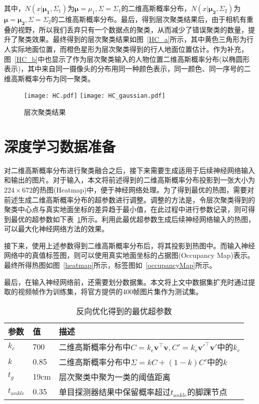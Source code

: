 其中，$N(x|\bm{\mu_1},\Sigma_1)$为$\bm{\mu}=\mu_1, \Sigma=\Sigma_1$的二维高斯概率分布，$N(x|\bm{\bm{\mu_2}},\Sigma_2)$为$\bm{\mu}=\bm{\mu_2}, \Sigma=\Sigma_2$的二维高斯概率分布。最后，得到层次聚类结果后，由于相机有重叠的视野，所以我们丢弃只有一个数据点的聚类，从而减少了错误聚类的数量，提升了聚类效果。最终得到的层次聚类结果如图~\ref{HC_a}所示，其中黄色三角形为行人实际地面位置，而橙色星形为层次聚类得到的行人地面位置估计。作为补充，图~\ref{HC_b}中也显示了作为层次聚类输入的人物位置二维高斯概率分布(以椭圆形表示)，其中来自同一摄像头的分布用同一种颜色表示，同一颜色、同一序号的二维高斯概率分布为同一聚类。
\begin{figure}
    \centering
    \subcaptionbox{\label{HC_a}}
      {\texttt{[image: HC.pdf]}}
    \subcaptionbox{\label{HC_b}}
      {\texttt{[image: HC\_gaussian.pdf]}}
    \caption{层次聚类结果}
    \label{HC}
\end{figure}

\section{深度学习数据准备}

对二维高斯概率分布进行聚类融合之后，接下来需要生成适用于后续神经网络输入和输出的图片。对于输入，本文将前述得到的二维高斯概率分布投影到一张大小为$224\times672$的热图(Heatmap)中，便于神经网络处理。为了得到最优的热图，需要对前述生成二维高斯概率分布的超参数进行调整。调整的方法是，令层次聚类得到的聚类中心点与真实地面坐标的差异趋于最小值，在此过程中进行参数记录，则可得到最优的超参数如下表~\ref{parameter_table}所示。利用此最优超参数生成后续神经网络输入的热图，可以最大化神经网络方法的效果。

接下来，使用上述参数得到二维高斯概率分布后，将其投影到热图中。而输入神经网络中的真值标签图，则可以使用真实地面坐标的占据图(Occupancy Map)\cite{fleuret2007multicamera}表示。最终所得热图如图~\ref{heatmap}所示，标签图如~\ref{occupancyMap}所示。

最后，在输入神经网络前，还需要划分数据集。本文将上文中数据集扩充时通过提取的视频帧作为训练集，将官方提供的400帧图片集作为测试集。
\begin{table}
    \centering
    \caption{反向优化得到的最优超参数}
    \begin{tabular}{lll}
        \toprule
        参数 & 值  & 描述         \\
        \midrule
        $k_{c}$ & 700 & 二维高斯概率分布中$C=k_{c}\bm{v}^\top\bm{v}, C'=k_{c}\bm{v}'^\top\bm{v}'$中的$k_{c}$ \\
        $k$   & 0.85 &  二维高斯概率分布中$\Sigma=kC + (1-k)C'$中的$k$   \\
        $t_{g}$ & 19cm &  层次聚类中聚为一类的阈值距离  \\
        $t_{ankle}$ & 0.35 &  单目探测器结果中保留概率超过$t_{ankle}$的脚踝节点 \\
        \bottomrule
    \end{tabular}
    \label{parameter_table}
\end{table}

